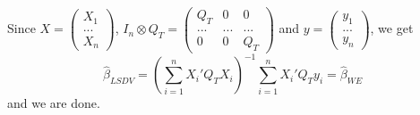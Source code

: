 \documentclass[12pt]{article}
\theoremstyle{definition}
\theoremstyle{property}
\theoremstyle{assumption}
\theoremstyle{example}
\theoremstyle{comment}
\begin{document}
Since ${X} = \begin{pmatrix}{X}_1\\ ... \\ {X}_n \end{pmatrix}$, $I_n\otimes Q_T =  \begin{pmatrix}Q_T & 0 & 0 \\ ...&...&...\\0 & 0 & Q_T \end{pmatrix}$ and ${y} = \begin{pmatrix}{y}_1\\ ... \\ {y}_n \end{pmatrix}$, we get
\[
\hat{\beta}_{LSDV}=\left(\sum_{i=1}^n {X}_i'Q_T {X}_i\right)^{-1}\sum_{i=1}^n {X}_i'Q_T {y}_i = \hat{\beta}_{WE}
\]
and we are done.
\end{document}

